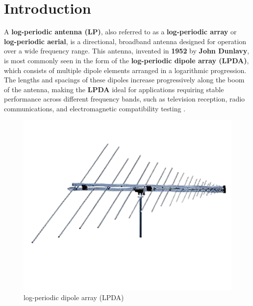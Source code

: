 \documentclass[a4paper, 12pt, english]{article}
\begin{document}

  \newpage
  \hypersetup{linkcolor=black}
  \tableofcontents

\newpage
\section{Introduction}
A \textbf{log-periodic antenna (LP)}, also referred to as a \textbf{log-periodic array} or \textbf{log-periodic aerial}, is a directional, broadband antenna designed for operation over a wide frequency range. This antenna, invented in \textbf{1952} by \textbf{John Dunlavy}, is most commonly seen in the form of the \textbf{log-periodic dipole array (LPDA)}, which consists of multiple dipole elements arranged in a logarithmic progression. The lengths and spacings of these dipoles increase progressively along the boom of the antenna, making the \textbf{LPDA} ideal for applications requiring stable performance across different frequency bands, such as television reception, radio communications, and electromagnetic compatibility testing \cite{balanis2016antenna}.
\begin{figure}[H]
    \centering
    \includegraphics[width=\linewidth]{images/LPDA.png}
    \caption{log-periodic dipole array (LPDA)}
    \label{fig:log-periodic dipole array (LPDA)}
\end{figure}
\end{document}
